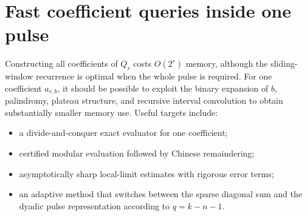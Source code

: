 \documentclass[11pt,a4paper,oneside,openany]{book}
\numberwithin{equation}{chapter}
\theoremstyle{definition}
\theoremstyle{remark}
\newcommand{\A}{Q}
\begin{document}
\section{Fast coefficient queries inside one pulse}

Constructing all coefficients of \(\A_r\) costs \(O(2^r)\) memory, although
the sliding-window recurrence is optimal when the whole pulse is required.
For one coefficient \(a_{r,b}\), it should be possible to exploit the
binary expansion of \(b\), palindromy, plateau structure, and recursive
interval convolution to obtain substantially smaller memory use.  Useful
targets include:
\begin{itemize}[leftmargin=2em]
\item a divide-and-conquer exact evaluator for one coefficient;
\item certified modular evaluation followed by Chinese remaindering;
\item asymptotically sharp local-limit estimates with rigorous error terms;
\item an adaptive method that switches between the sparse diagonal sum and
the dyadic pulse representation according to \(q=k-n-1\).
\end{itemize}
\end{document}

